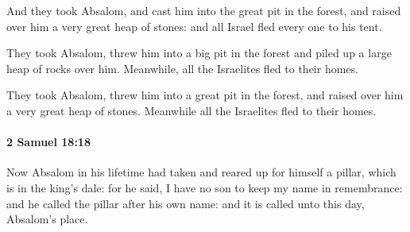 			\begin{versebox}
					\item[BHS] 
					\item[ASV] And they took Absalom, and cast him into the great pit in the forest, and raised over him a very great heap of stones: and all Israel fled every one to his tent.
					\item[NIV] They took Absalom, threw him into a big pit in the forest and piled up a large heap of rocks over him. Meanwhile, all the Israelites fled to their homes.
					\item[NRSV] They took Absalom, threw him into a great pit in the forest, and raised over him a very great heap of stones. Meanwhile all the Israelites fled to their homes.
			\end{versebox}

		\paragraph{2 Samuel 18:18} %
			\label{2SAMUEL-18-18}

			Now Absalom in his lifetime had taken and reared up for himself a pillar, which is in the king’s dale: for he said, I have no son to keep my name in remembrance: and he called the pillar after his own name: and it is called unto this day, Absalom’s place.

